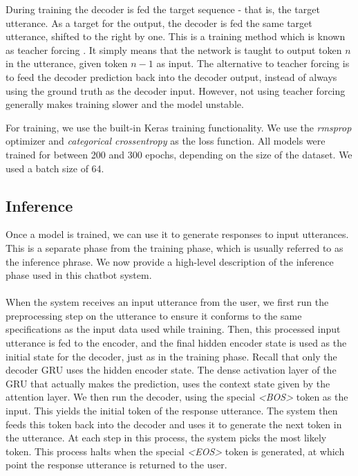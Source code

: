 \documentclass{article}
\begin{document}
During training the decoder is fed the target sequence - that is, the target
utterance. As a target for the output, the decoder is fed the same target utterance, shifted to the right by one.
This is a training method which is known as teacher forcing
\cite{teacher-forcing}. It simply means that the network is taught to output
token $n$ in the utterance, given token $n-1$ as input. The alternative to
teacher forcing is to feed the decoder prediction back into the decoder output,
instead of always using the ground truth as the decoder input. However, not
using teacher forcing generally makes training slower and the model unstable.

For training, we use the built-in Keras training functionality. We use the
\emph{rmsprop} optimizer and \emph{categorical crossentropy} as the loss
function. All models were trained for between 200 and 300 epochs, depending
on the size of the dataset. We used a batch size of 64.

\subsection*{Inference}

Once a model is trained, we can use it to generate responses to input
utterances. This is a separate phase from the training phase, which is usually
referred to as the inference phrase. We now provide a high-level description
of the inference phase used in this chatbot system.

\paragraph{}
When the system receives an input utterance from the user, we first run the
preprocessing step on the utterance to ensure it conforms to the same
specifications as the input data used while training. Then, this processed
input utterance is fed to the encoder, and the final hidden encoder state is
used as the initial state for the decoder, just as in the training phase.
Recall that only the decoder GRU uses the hidden encoder state. The dense
activation layer of the GRU that actually makes the prediction, uses the
context state given by the attention layer. We then run the decoder, using the
special \emph{<BOS>} token as the input.  This yields the initial token of the
response utterance. The system then feeds this token back into the decoder and
uses it to generate the next token in the utterance. At each step in this
process, the system picks the most likely token. This process halts when the
special \emph{<EOS>} token is generated, at which point the response utterance
is returned to the user.
\end{document}
